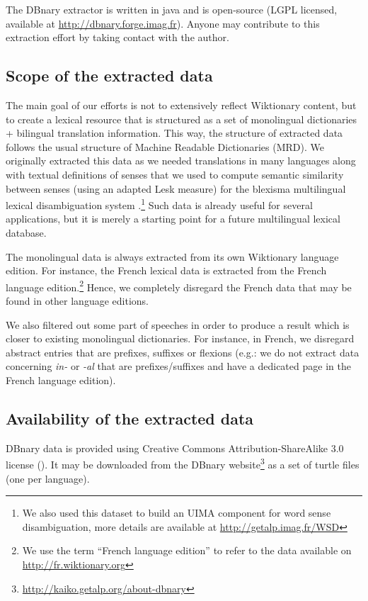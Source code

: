 \documentclass[sw]{iosart2c}
\begin{document}
The DBnary extractor is written in java and is open-source (LGPL licensed, available at \url{http://dbnary.forge.imag.fr}). Anyone may contribute to this extraction effort by taking contact with the author.

\subsection{Scope of the extracted data}

The main goal of our efforts is not to extensively reflect Wiktionary content, but to create a lexical resource that is structured as a set of monolingual dictionaries + bilingual translation information. This way, the structure of extracted data follows the usual structure of Machine Readable Dictionaries (MRD). We originally extracted this data as we needed translations in many languages along with textual definitions of senses that we used to compute semantic similarity between senses (using an adapted Lesk measure) for the blexisma multilingual lexical disambiguation system \cite{schwab2012coling}.\footnote{We also used this dataset to build an UIMA component for word sense disambiguation, more details are available at \url{http://getalp.imag.fr/WSD}} Such data is already useful for several applications, but it is merely a starting point for a future multilingual lexical database.

The monolingual data is always extracted from its own Wiktionary language edition. For instance, the French lexical data is extracted from the French language edition.\footnote{We use the term ``French language edition'' to refer to the data available on \url{http://fr.wiktionary.org}} Hence, we completely disregard the French data that may be found in other language editions.

We also filtered out some part of speeches in order to produce a result which is closer to existing monolingual dictionaries. For instance, in French, we disregard abstract entries that are prefixes, suffixes or flexions (e.g.: we do not extract data concerning \textit{in-} or \textit{-al} that are prefixes/suffixes and have a dedicated page in the French language edition).

\subsection{Availability of the extracted data}

DBnary data is provided using Creative Commons Attribution-ShareAlike 3.0 license (\ccbysa). It may be downloaded from the DBnary website\footnote{\url{http://kaiko.getalp.org/about-dbnary}} as a set of turtle files (one per language).
\end{document}
